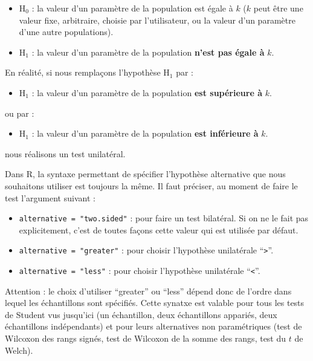 \documentclass[a4paperpaper,]{article}
\providecommand{\tightlist}{%
  \setlength{\itemsep}{0pt}\setlength{\parskip}{0pt}}
\begin{document}
\begin{itemize}
\tightlist
\item
  H\(_0\) : la valeur d'un paramètre de la population est égale à \(k\) (\(k\) peut être une valeur fixe, arbitraire, choisie par l'utilisateur, ou la valeur d'un paramètre d'une autre populations).
\item
  H\(_1\) : la valeur d'un paramètre de la population \textbf{n'est pas égale à} \(k\).
\end{itemize}

En réalité, si nous remplaçons l'hypothèse H\(_1\) par :

\begin{itemize}
\tightlist
\item
  H\(_1\) : la valeur d'un paramètre de la population \textbf{est supérieure à} \(k\).
\end{itemize}

ou par :

\begin{itemize}
\tightlist
\item
  H\(_1\) : la valeur d'un paramètre de la population \textbf{est inférieure à} \(k\).
\end{itemize}

nous réalisons un test unilatéral.

Dans R, la syntaxe permettant de spécifier l'hypothèse alternative que nous souhaitons utiliser est toujours la même. Il faut préciser, au moment de faire le test l'argument suivant :

\begin{itemize}
\tightlist
\item
  \texttt{alternative\ =\ "two.sided"} : pour faire un test bilatéral. Si on ne le fait pas explicitement, c'est de toutes façons cette valeur qui est utilisée par défaut.
\item
  \texttt{alternative\ =\ "greater"} : pour choisir l'hypothèse unilatérale ``\texttt{\textgreater{}}''.
\item
  \texttt{alternative\ =\ "less"} : pour choisir l'hypothèse unilatérale ``\texttt{\textless{}}''.
\end{itemize}

Attention : le choix d'utiliser ``greater'' ou ``less'' dépend donc de l'ordre dans lequel les échantillons sont spécifiés. Cette synatxe est valable pour tous les tests de Student vus jusqu'ici (un échantillon, deux échantillons appariés, deux échantillons indépendants) et pour leurs alternatives non paramétriques (test de Wilcoxon des rangs signés, test de Wilcoxon de la somme des rangs, test du \(t\) de Welch).
\end{document}
